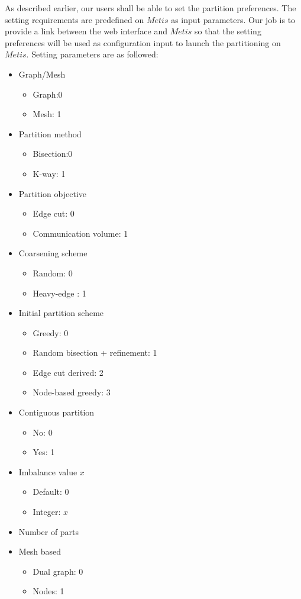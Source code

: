 \documentclass{cranfieldChart}
\begin{document}
As described earlier, our users shall be able to set the partition preferences. The setting requirements are predefined on $Metis$ as input parameters. Our job is to provide a link between the web interface and $Metis$ so that the setting preferences will be used as configuration input to launch the partitioning on $Metis$. Setting parameters are as followed:\\ 
\begin{itemize}
    \item Graph/Mesh 
    \begin{itemize}
        \item Graph:0
        \item Mesh: 1
    \end{itemize}
    \item Partition method
    \begin{itemize}
        \item Bisection:0
        \item K-way: 1
    \end{itemize}
    \item Partition objective
    \begin{itemize}
        \item Edge cut: 0
        \item Communication volume: 1
    \end{itemize}
    \item Coarsening scheme
    \begin{itemize}
        \item Random: 0
        \item Heavy-edge : 1
    \end{itemize}
    \item  Initial partition scheme
    \begin{itemize}
        \item Greedy: 0
        \item Random bisection + refinement: 1
        \item Edge cut derived: 2
        \item Node-based greedy: 3
    \end{itemize}
    \item Contiguous partition
    \begin{itemize}
        \item No: 0
        \item Yes: 1
    \end{itemize}
    \item Imbalance value $x$
    \begin{itemize}
        \item Default: 0
        \item Integer: $x$
    \end{itemize}
    \item Number of parts 
    \item Mesh based
    \begin{itemize}
        \item Dual graph: 0
        \item Nodes: 1
    \end{itemize}
    
\end{itemize}
\end{document}
